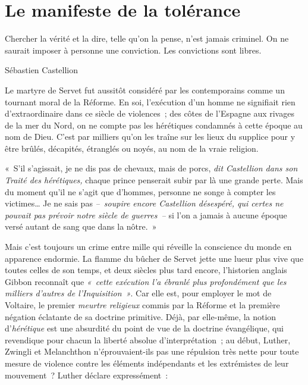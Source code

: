 \documentclass[french,twoside]{book} %
\newcommand{\bibl}[1]{{\smallskip\RaggedLeft\normalsize\normalfont #1\par\medskip}}
\newenvironment{epigraph}{\begin{addmargin}[2\parindent]{0em}\sffamily\large\setstretch{0.95}}{\end{addmargin}\bigskip}
\newenvironment{quoteblock}%
  {\begin{quoting}}
  {\end{quoting}}
\newcommand\chapteropen{} %
\newcommand\chaptercont{} %
\newenvironment{quotebar}{%
    \def\FrameCommand{{\color{rubric!10!}\vrule width 0.5em} \hspace{0.9em}}%
    \def\OuterFrameSep{0pt} %
    \MakeFramed {\advance\hsize-\width \FrameRestore}
  }%
  {%
    \endMakeFramed
  }
\renewenvironment{quoteblock}%
  {%
    \savenotes
    \setstretch{0.9}
    \begin{quotebar}
    \smallskip
  }
  {%
    \smallskip
    \end{quotebar}
    \spewnotes
  }
\begin{document}
\chapteropen

\chapter[{Le manifeste de la tolérance}]{Le manifeste de la tolérance}
\renewcommand{\leftmark}{Le manifeste de la tolérance}


\begin{epigraph}
\noindent Chercher la vérité et la dire, telle qu’on la pense, n’est jamais criminel. On ne saurait imposer à personne une conviction. Les convictions sont libres.\par

\bibl{Sébastien Castellion}
\end{epigraph}


\chaptercont
\noindent Le martyre de Servet fut aussitôt considéré par les contemporains comme un tournant moral de la Réforme. En soi, l’exécution d’un homme ne signifiait rien d’extraordinaire dans ce siècle de violences ; des côtes de l’Espagne aux rivages de la mer du Nord, on ne compte pas les hérétiques condamnés à cette époque au nom de Dieu. C’est par milliers qu’on les traîne sur les lieux du supplice pour y être brûlés, décapités, étranglés ou noyés, au nom de la vraie religion.\par

\begin{quoteblock}
\noindent « S’il s’agissait, je ne dis pas de chevaux, mais de porcs, \emph{dit Castellion dans son \emph{Traité des hérétiques}, }chaque prince penserait subir par là une grande perte. Mais du moment qu’il ne s’agit que d’hommes, personne ne songe à compter les victimes… Je ne sais pas \emph{– soupire encore Castellion désespéré, qui certes ne pouvait pas prévoir notre siècle de guerres –} si l’on a jamais à aucune époque versé autant de sang que dans la nôtre. »\end{quoteblock}

\noindent Mais c’est toujours un crime entre mille qui réveille la conscience du monde en apparence endormie. La flamme du bûcher de Servet jette une lueur plus vive que toutes celles de son temps, et deux siècles plus tard encore, l’historien anglais Gibbon reconnaît que \emph{« cette exécution l’a ébranlé plus profondément que les milliers d’autres de l’Inquisition »}. Car elle est, pour employer le mot de Voltaire, le premier \emph{meurtre religieux} commis par la Réforme et la première négation éclatante de sa doctrine primitive. Déjà, par elle-même, la notion d’\emph{hérétique} est une absurdité du point de vue de la doctrine évangélique, qui revendique pour chacun la liberté absolue d’interprétation ; au début, Luther, Zwingli et Melanchthon n’éprouvaient-ils pas une répulsion très nette pour toute mesure de violence contre les éléments indépendants et les extrémistes de leur mouvement ? Luther déclare expressément :\par
\end{document}
